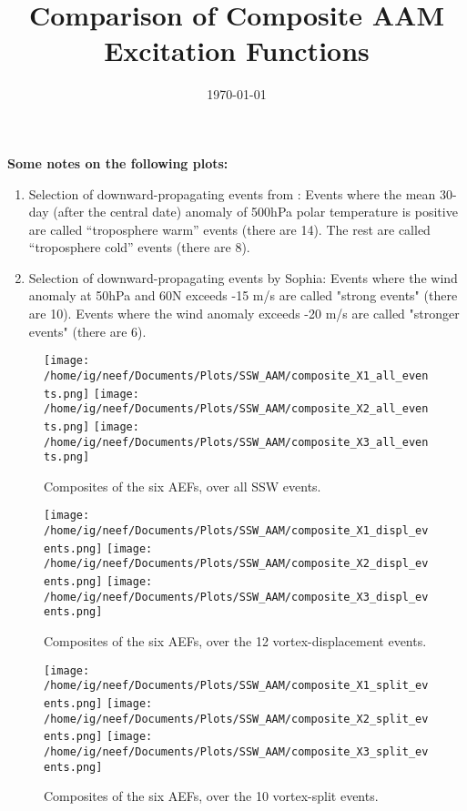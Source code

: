 \documentclass[11pt]{article}
\title{Comparison of Composite AAM Excitation Functions}
\date{\today}
\begin{document}
\maketitle   

\noindent \textbf{Some notes on the following plots:}

\begin{enumerate}
\item Selection of downward-propagating events from \citet{nakagawayamazaki2006}:  Events where the mean 30-day (after the central date) anomaly of 500hPa polar temperature is positive are called ``troposphere warm'' events (there are 14).  The rest are called ``troposphere cold'' events (there are 8).
%
\item Selection of downward-propagating events by Sophia: Events where the wind anomaly at 50hPa and 60N exceeds -15 m/s are called "strong events" (there are 10).  Events where the wind anomaly exceeds -20 m/s are called "stronger events" (there are 6).  
\end{enumerate}






\begin{figure}
  \noindent
  \texttt{[image: /home/ig/neef/Documents/Plots/SSW\_AAM/composite\_X1\_all\_events.png]}
  \texttt{[image: /home/ig/neef/Documents/Plots/SSW\_AAM/composite\_X2\_all\_events.png]}
  \texttt{[image: /home/ig/neef/Documents/Plots/SSW\_AAM/composite\_X3\_all\_events.png]}
  \caption{Composites of the six AEFs, over all SSW events.}
   \label{fig:all_events}
 \end{figure}

\begin{figure}
  \noindent
  \texttt{[image: /home/ig/neef/Documents/Plots/SSW\_AAM/composite\_X1\_displ\_events.png]}
  \texttt{[image: /home/ig/neef/Documents/Plots/SSW\_AAM/composite\_X2\_displ\_events.png]}
  \texttt{[image: /home/ig/neef/Documents/Plots/SSW\_AAM/composite\_X3\_displ\_events.png]}
  \caption{Composites of the six AEFs, over the 12 vortex-displacement events.}
   \label{fig:displ_events}
 \end{figure}

\begin{figure}
  \noindent
  \texttt{[image: /home/ig/neef/Documents/Plots/SSW\_AAM/composite\_X1\_split\_events.png]}
  \texttt{[image: /home/ig/neef/Documents/Plots/SSW\_AAM/composite\_X2\_split\_events.png]}
  \texttt{[image: /home/ig/neef/Documents/Plots/SSW\_AAM/composite\_X3\_split\_events.png]}
  \caption{Composites of the six AEFs, over the 10 vortex-split events.}
   \label{fig:split_events}
 \end{figure}
\end{document}
